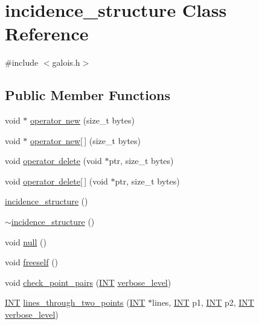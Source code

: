 \hypertarget{classincidence__structure}{}\section{incidence\+\_\+structure Class Reference}
\label{classincidence__structure}


{\ttfamily \#include $<$galois.\+h$>$}

\subsection*{Public Member Functions}
\begin{DoxyCompactItemize}
\item 
void $\ast$ \mbox{\hyperlink{classincidence__structure_a4d04490ec682cc5901a5c84b3817eca1}{operator new}} (size\+\_\+t bytes)
\item 
void $\ast$ \mbox{\hyperlink{classincidence__structure_a010dc7086fd5a2500027afccae20916d}{operator new\mbox{[}$\,$\mbox{]}}} (size\+\_\+t bytes)
\item 
void \mbox{\hyperlink{classincidence__structure_a87bb620c8c4933f1b6a2dbe225fb6411}{operator delete}} (void $\ast$ptr, size\+\_\+t bytes)
\item 
void \mbox{\hyperlink{classincidence__structure_aa57f02f0ee8610b67b1065c20d968130}{operator delete\mbox{[}$\,$\mbox{]}}} (void $\ast$ptr, size\+\_\+t bytes)
\item 
\mbox{\hyperlink{classincidence__structure_ad90a5cac0b53708b711487d3e2e0da8a}{incidence\+\_\+structure}} ()
\item 
\mbox{\hyperlink{classincidence__structure_aa4dfbb9a79caf70d882ef5d0f35e9fe3}{$\sim$incidence\+\_\+structure}} ()
\item 
void \mbox{\hyperlink{classincidence__structure_a83fb7042009486cd766cfc3c410cbc48}{null}} ()
\item 
void \mbox{\hyperlink{classincidence__structure_a2c962871ee384bccc46d9dbd8c3eea93}{freeself}} ()
\item 
void \mbox{\hyperlink{classincidence__structure_a450b2acc1b10fd9a260f131913d3fc6d}{check\+\_\+point\+\_\+pairs}} (\mbox{\hyperlink{galois_8h_a09fddde158a3a20bd2dcadb609de11dc}{I\+NT}} \mbox{\hyperlink{simeon_8_c_a818073fbcc2f439e7c56952f67386122}{verbose\+\_\+level}})
\item 
\mbox{\hyperlink{galois_8h_a09fddde158a3a20bd2dcadb609de11dc}{I\+NT}} \mbox{\hyperlink{classincidence__structure_ac64fa4f71495e9db3c2b3a301fd0c7f3}{lines\+\_\+through\+\_\+two\+\_\+points}} (\mbox{\hyperlink{galois_8h_a09fddde158a3a20bd2dcadb609de11dc}{I\+NT}} $\ast$lines, \mbox{\hyperlink{galois_8h_a09fddde158a3a20bd2dcadb609de11dc}{I\+NT}} p1, \mbox{\hyperlink{galois_8h_a09fddde158a3a20bd2dcadb609de11dc}{I\+NT}} p2, \mbox{\hyperlink{galois_8h_a09fddde158a3a20bd2dcadb609de11dc}{I\+NT}} \mbox{\hyperlink{simeon_8_c_a818073fbcc2f439e7c56952f67386122}{verbose\+\_\+level}})

\end{DoxyCompactItemize}
